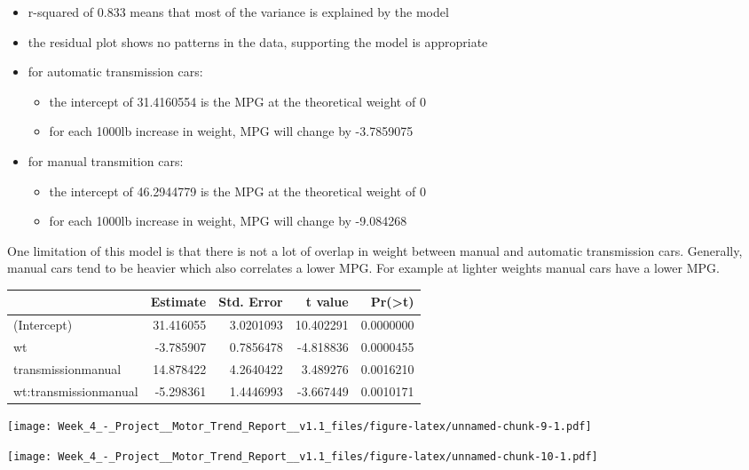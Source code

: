 \documentclass[]{article}
\providecommand{\tightlist}{%
  \setlength{\itemsep}{0pt}\setlength{\parskip}{0pt}}
\begin{document}
\begin{itemize}
\tightlist
\item
  r-squared of 0.833 means that most of the variance is explained by the
  model
\item
  the residual plot shows no patterns in the data, supporting the model
  is appropriate
\item
  for automatic transmission cars:

  \begin{itemize}
  \tightlist
  \item
    the intercept of 31.4160554 is the MPG at the theoretical weight of
    0
  \item
    for each 1000lb increase in weight, MPG will change by -3.7859075
  \end{itemize}
\item
  for manual transmition cars:

  \begin{itemize}
  \tightlist
  \item
    the intercept of 46.2944779 is the MPG at the theoretical weight of
    0
  \item
    for each 1000lb increase in weight, MPG will change by -9.084268
  \end{itemize}
\end{itemize}

One limitation of this model is that there is not a lot of overlap in
weight between manual and automatic transmission cars. Generally, manual
cars tend to be heavier which also correlates a lower MPG. For example
at lighter weights manual cars have a lower MPG.

\begin{longtable}[]{@{}lrrrr@{}}
\toprule
& Estimate & Std. Error & t value &
Pr(\textgreater{}\textbar{}t\textbar{})\tabularnewline
\midrule
\endhead
(Intercept) & 31.416055 & 3.0201093 & 10.402291 &
0.0000000\tabularnewline
wt & -3.785907 & 0.7856478 & -4.818836 & 0.0000455\tabularnewline
transmissionmanual & 14.878422 & 4.2640422 & 3.489276 &
0.0016210\tabularnewline
wt:transmissionmanual & -5.298361 & 1.4446993 & -3.667449 &
0.0010171\tabularnewline
\bottomrule
\end{longtable}

\texttt{[image: Week\_4\_-\_Project\_\_Motor\_Trend\_Report\_\_v1.1\_files/figure-latex/unnamed-chunk-9-1.pdf]}

\texttt{[image: Week\_4\_-\_Project\_\_Motor\_Trend\_Report\_\_v1.1\_files/figure-latex/unnamed-chunk-10-1.pdf]}
\end{document}
